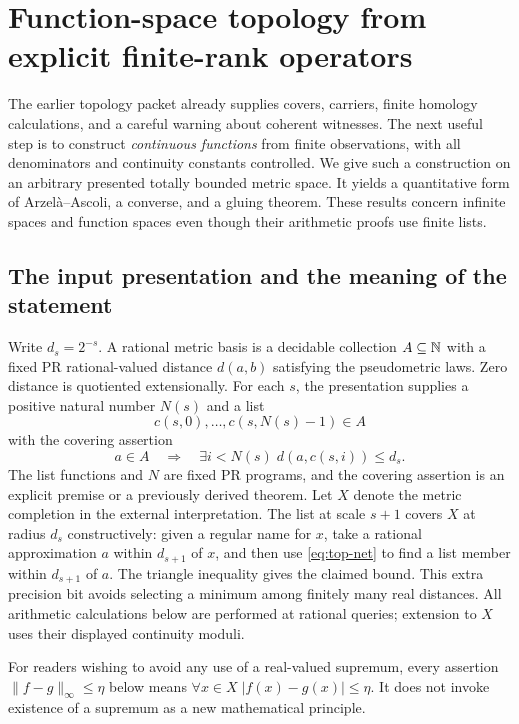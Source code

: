 \section{Function-space topology from explicit finite-rank operators}
\label{sec:function-topology}

The earlier topology packet already supplies covers, carriers, finite
homology calculations, and a careful warning about coherent witnesses.
The next useful step is to construct \emph{continuous functions} from
finite observations, with all denominators and continuity constants
controlled.  We give such a construction on an arbitrary presented
totally bounded metric space.  It yields a quantitative form of
Arzel\`a--Ascoli, a converse, and a gluing theorem.  These results concern
infinite spaces and function spaces even though their arithmetic proofs
use finite lists.

\subsection{The input presentation and the meaning of the statement}

Write $d_s=2^{-s}$.  A rational metric basis is a decidable collection
$A\subseteq\mathbb N$ with a fixed PR rational-valued distance $d(a,b)$ satisfying
the pseudometric laws.  Zero distance is quotiented extensionally.
For each $s$, the presentation supplies a positive natural number $N(s)$
and a list
\[
 c(s,0),\ldots,c(s,N(s)-1)\in A
\]
with the covering assertion
\begin{equation}\label{eq:top-net}
 a\in A\quad\Longrightarrow\quad
 \exists i<N(s)\;d(a,c(s,i))\le d_s.
\end{equation}
The list functions and $N$ are fixed PR programs, and the covering
assertion is an explicit premise or a previously derived theorem.
Let $X$ denote the metric completion in the external interpretation.
The list at scale $s+1$ covers $X$ at radius $d_s$ constructively:
given a regular name for $x$, take a rational approximation $a$ within
$d_{s+1}$ of $x$, and then use \eqref{eq:top-net} to find a list
member within $d_{s+1}$ of $a$.  The triangle inequality gives the
claimed bound.  This extra precision bit avoids selecting a minimum
among finitely many real distances.  All arithmetic calculations
below are performed at rational queries; extension to $X$ uses their
displayed continuity moduli.

For readers wishing to avoid any use of a real-valued supremum, every
assertion $\|f-g\|_\infty\le\eta$ below means
$\forall x\in X\;|f(x)-g(x)|\le\eta$.  It does not invoke existence of a
supremum as a new mathematical principle.

